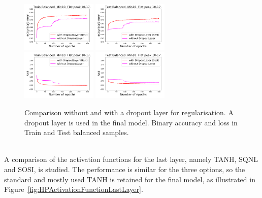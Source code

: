 \begin{figure}[!htb]
\centering
\includegraphics[width=0.32\textwidth]{plots/plot_01_1_overlay_graph_accuracyBinary_Train_DropoutLayer.pdf}
\includegraphics[width=0.32\textwidth]{plots/plot_01_1_overlay_graph_accuracyBinary_Test_DropoutLayer.pdf}\\
\includegraphics[width=0.32\textwidth]{plots/plot_01_1_overlay_graph_loss_Train_DropoutLayer.pdf}
\includegraphics[width=0.32\textwidth]{plots/plot_01_1_overlay_graph_loss_Test_DropoutLayer.pdf}\\
\caption{Comparison without and with a dropout layer for regularisation. A dropout layer is used in the final model. Binary accuracy and loss in Train and Test balanced samples.}
\label{fig:HPDropoutLayer}
\end{figure}

\ \\A comparison of the activation functions for the last layer, namely TANH, SQNL and SOSI, is studied. The performance is similar for the three options, so the standard and mostly used TANH is retained for the final model, as illustrated in Figure~\ref{fig:HPActivationFunctionLastLayer}.

